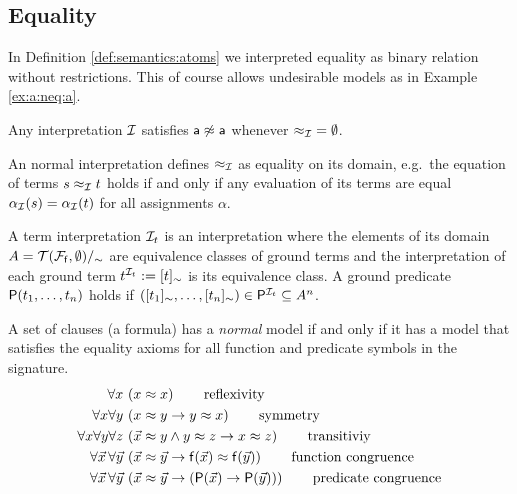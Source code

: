 \subsection{Equality}

In Definition \ref{def:semantics:atoms} we interpreted equality as binary relation without restrictions.
This of course allows undesirable models as in Example \ref{ex:a:neq:a}.

\begin{example}
	\label{ex:a:neq:a}
	Any interpretation ${\mathcal I}$ satisfies ${\mathsf a}\not\approx{\mathsf a}$ 
	whenever ${\approx_{\mathcal I}} = \emptyset$.
\end{example}

\begin{definition}
	An {\myem normal} interpretation defines $\approx_{\mathcal I}$ as equality on its domain,
	e.g.~the equation of terms $s \approx_{\mathcal I} t$ holds if and only 
	if any evaluation of its terms are equal $\alpha_{\mathcal I}(s) = \alpha_{\mathcal I}(t)$ 
	for all assignments $\alpha$.
\end{definition}

\begin{definition}
	A {\myem term interpretation} 
	${\mathcal I}_t$ 
	is an interpretation 
	where the elements of its domain $A = {{\mathcal T}({\mathcal F}_{\mathsf f},\emptyset)}/_\sim$ 
	are equivalence classes of ground terms
	and the interpretation of each ground term $t^{{\mathcal I}_t} := [t]_\sim$ is its equivalence class.
	A ground predicate ${\mathsf P}(t_1,\ldots,t_n)$ holds if 
	$([t_1]_\sim,\ldots,[t_n]_\sim) \in {\mathsf P}^{{\mathcal I}_t} \subseteq A^n$.
\end{definition}

\begin{lemma}
	A set of clauses (a formula) has a \emph{normal} model 
	if and only if it has a model that satisfies the 
	{\myem equality axioms}
	for all function and predicate symbols in the signature.
	\begin{align*}
		\forall x\, 
		&\left(x \approx x\right) 
		\tag*{reflexivity}
		\\
		\forall x \forall y\, 
		&\left(x \approx y \rightarrow y \approx x \right)
		\tag*{symmetry} 
		\\
		\forall x \forall y \forall z\,
		&\left(\vec x \approx y \land y\approx z \rightarrow x\approx z\right) 
		\tag*{transitiviy}
		\\
		\forall\vec{x}\,\forall\vec{y}\,
		&\left(\vec{x}\approx\vec{y} \rightarrow {\mathsf f}(\vec{x}) \approx {\mathsf f}(\vec{y}) \right)
		\tag*{function congruence}
		\\
		\forall\vec{x}\,\forall\vec{y}\, 
		&\left(\vec{x}\approx\vec{y} \rightarrow ({\mathsf P}(\vec{x}) \rightarrow {\mathsf P}(\vec{y}))\right)
		\tag*{predicate congruence}
	\end{align*}
\end{lemma}

